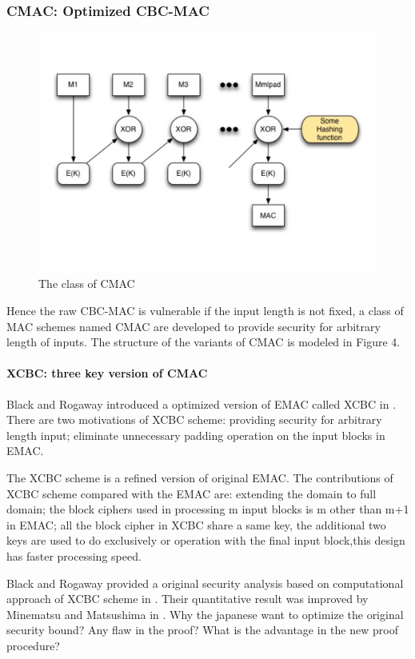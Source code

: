 \documentclass{article}
\begin{document}
\subsubsection{CMAC: Optimized CBC-MAC}
\begin{figure}[htbp]
\centering
\includegraphics[scale=0.3]{./diagram/cmac.pdf}
\caption{The class of CMAC}
\label{fig: }
\end{figure}
Hence the raw CBC-MAC is vulnerable if the input length is not fixed, a class of MAC schemes named CMAC are developed to provide security for arbitrary length of inputs. The structure of the  variants of CMAC is modeled in Figure 4.
\paragraph{XCBC: three key version of CMAC }
Black and Rogaway introduced a optimized version of EMAC called XCBC in \cite{xcbc}.
There are two motivations of XCBC scheme: providing security for arbitrary length input; eliminate unnecessary padding operation on the input blocks in EMAC.

The XCBC scheme is a refined version of original EMAC. The contributions of XCBC scheme compared with the EMAC are: extending the domain to full domain; the block ciphers used in processing m input blocks is m other than m+1 in EMAC; all the block cipher in XCBC share a same key, the additional two keys are used to do exclusively or operation with the final input block,this design has faster processing speed.   

Black and Rogaway provided a original security analysis based on computational approach of XCBC scheme in \cite{xcbc}. Their quantitative result was improved by Minematsu and Matsushima in \cite{new}. 
Why the japanese want to optimize the original security bound? Any flaw in the proof? What is the advantage in the new proof procedure?
\end{document}
